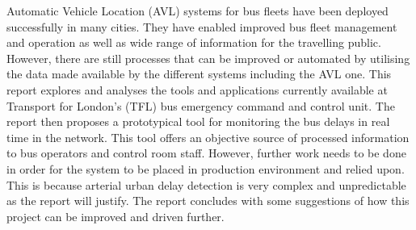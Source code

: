 Automatic Vehicle Location (AVL) systems for bus fleets have been deployed successfully in many cities. They have enabled improved bus fleet management and operation as well as wide range of information for the travelling public. However, there are still processes that can be improved or automated by utilising the data made available by the different systems including the AVL one. This report explores and analyses the tools and applications currently available at Transport for London's (TFL) bus emergency command and control unit. The report then proposes a prototypical tool for monitoring the bus delays in real time in the network. This tool offers an objective source of processed information to bus operators and control room staff. However, further work needs to be done in order for the system to be placed in production environment and relied upon. This is because arterial urban delay detection is very complex and unpredictable as the report will justify. The report concludes with some suggestions of how this project can be improved and driven further.





